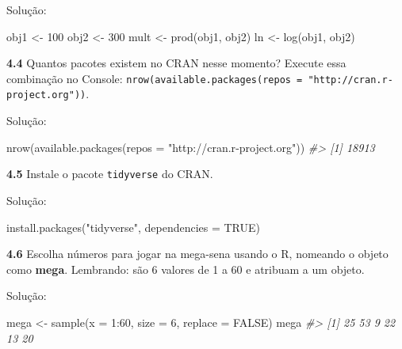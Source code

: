 \documentclass[
]{book}
\newenvironment{Shaded}{\begin{snugshade}}{\end{snugshade}}
\newcommand{\AttributeTok}[1]{\textcolor[rgb]{0.77,0.63,0.00}{#1}}
\newcommand{\CommentTok}[1]{\textcolor[rgb]{0.56,0.35,0.01}{\textit{#1}}}
\newcommand{\ConstantTok}[1]{\textcolor[rgb]{0.00,0.00,0.00}{#1}}
\newcommand{\DecValTok}[1]{\textcolor[rgb]{0.00,0.00,0.81}{#1}}
\newcommand{\FunctionTok}[1]{\textcolor[rgb]{0.00,0.00,0.00}{#1}}
\newcommand{\NormalTok}[1]{#1}
\newcommand{\OtherTok}[1]{\textcolor[rgb]{0.56,0.35,0.01}{#1}}
\newcommand{\SpecialCharTok}[1]{\textcolor[rgb]{0.00,0.00,0.00}{#1}}
\newcommand{\StringTok}[1]{\textcolor[rgb]{0.31,0.60,0.02}{#1}}
\begin{document}
Solução:

\begin{Shaded}
\begin{Highlighting}[]
\NormalTok{obj1 }\OtherTok{\textless{}{-}} \DecValTok{100}
\NormalTok{obj2 }\OtherTok{\textless{}{-}} \DecValTok{300}
\NormalTok{mult }\OtherTok{\textless{}{-}} \FunctionTok{prod}\NormalTok{(obj1, obj2)}
\NormalTok{ln }\OtherTok{\textless{}{-}} \FunctionTok{log}\NormalTok{(obj1, obj2)}
\end{Highlighting}
\end{Shaded}

\textbf{4.4}
Quantos pacotes existem no CRAN nesse momento? Execute essa combinação no Console: \texttt{nrow(available.packages(repos\ =\ "http://cran.r-project.org"))}.

Solução:

\begin{Shaded}
\begin{Highlighting}[]
\FunctionTok{nrow}\NormalTok{(}\FunctionTok{available.packages}\NormalTok{(}\AttributeTok{repos =} \StringTok{"http://cran.r{-}project.org"}\NormalTok{))}
\CommentTok{\#\textgreater{} [1] 18913}
\end{Highlighting}
\end{Shaded}

\textbf{4.5}
Instale o pacote \texttt{tidyverse} do CRAN.

Solução:

\begin{Shaded}
\begin{Highlighting}[]
\FunctionTok{install.packages}\NormalTok{(}\StringTok{"tidyverse"}\NormalTok{, }\AttributeTok{dependencies =} \ConstantTok{TRUE}\NormalTok{)}
\end{Highlighting}
\end{Shaded}

\textbf{4.6}
Escolha números para jogar na mega-sena usando o R, nomeando o objeto como \textbf{mega}. Lembrando: são 6 valores de 1 a 60 e atribuam a um objeto.

Solução:

\begin{Shaded}
\begin{Highlighting}[]
\NormalTok{mega }\OtherTok{\textless{}{-}} \FunctionTok{sample}\NormalTok{(}\AttributeTok{x =} \DecValTok{1}\SpecialCharTok{:}\DecValTok{60}\NormalTok{, }\AttributeTok{size =} \DecValTok{6}\NormalTok{, }\AttributeTok{replace =} \ConstantTok{FALSE}\NormalTok{)}
\NormalTok{mega}
\CommentTok{\#\textgreater{} [1] 25 53  9 22 13 20}
\end{Highlighting}
\end{Shaded}
\end{document}
